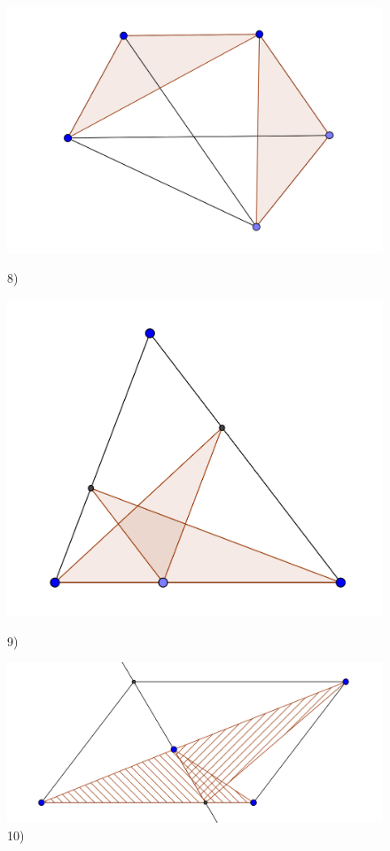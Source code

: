 \begin{figure}[!h]
\includegraphics[width=1.2\linewidth]{5}
\caption{8)}
\endminipage\hfill
{}
\includegraphics[width=1.2\linewidth]{6}
\caption{9)}
\endminipage\hfill
{}
\includegraphics[width=1.2\linewidth]{3}
\caption{10)}
\endminipage
\end{figure}

